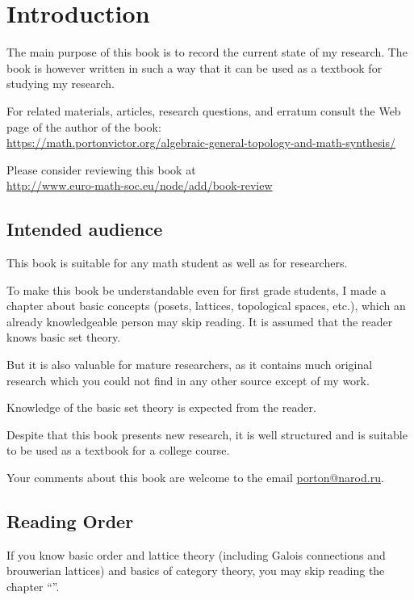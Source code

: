 
\chapter{Introduction}

The main purpose of this book is to record the current state of my
research. The book is however written in such a way that it can be
used as a textbook for studying my research.

For related materials, articles, research questions, and erratum consult
the Web page of the author of the book:\\
\url{https://math.portonvictor.org/algebraic-general-topology-and-math-synthesis/}

Please consider reviewing this book at\\
\href{http://www.euro-math-soc.eu/node/add/book-review}{http://www.euro-math-soc.eu/node/add/book-review}

\section{Intended audience }

This book is suitable for any math student as well as for researchers.

To make this book be understandable even for first grade students,
I made a chapter about basic concepts (posets, lattices, topological
spaces, etc.), which an already knowledgeable person may skip reading.
It is assumed that the reader knows basic set theory.

But it is also valuable for mature researchers, as it contains much
original research which you could not find in any other source except
of my work.

Knowledge of the basic set theory is expected from the reader.

Despite that this book presents new research, it is well structured
and is suitable to be used as a textbook for a college course.

Your comments about this book are welcome to the email \href{mailto:porton@narod.ru}{porton@narod.ru}.


\section{Reading Order }

If you know basic order and lattice theory (including Galois connections
and brouwerian lattices) and basics of category theory, you may skip
reading the chapter ``''.

